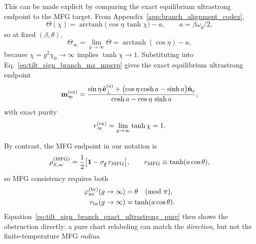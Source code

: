This can be made explicit by comparing the exact equilibrium ultrastrong endpoint to the MFG target.  From
Appendix~\ref{app:branch_alignment_codex},
\begin{equation}
    \Theta(\chi)=\operatorname{arctanh}\!\bigl(\cos\eta\,\tanh\chi\bigr)-a,
    \qquad a=\beta\omega_q/2,
    \label{eq:tilt_sign_branch_Theta_of_chi_eta}
\end{equation}
so at fixed $(\beta,\theta)$,
\begin{equation}
    \Theta_\infty=\lim_{g\to\infty}\Theta=\operatorname{arctanh}(\cos\eta)-a,
    \label{eq:tilt_sign_branch_Theta_infty}
\end{equation}
because $\chi=g^2\chi_0\to\infty$ implies $\tanh\chi\to 1$.  Substituting into
Eq.~\eqref{eq:tilt_sign_branch_mz_mperp} gives the exact equilibrium ultrastrong endpoint
\begin{equation}
    \mathbf m_{\infty}^{\rm(ex)}
    =
    \frac{
        \sin\eta\,\hat{\mathbf e}_{\perp}^{(s)}
        +
        \bigl(\cos\eta\cosh a-\sinh a\bigr)\hat{\mathbf n}_s
    }{
        \cosh a-\cos\eta\,\sinh a
    },
    \label{eq:tilt_sign_branch_exact_ultrastrong_vector}
\end{equation}
with exact purity
\begin{equation}
    r_{\infty}^{\rm(ex)}=\lim_{g\to\infty}\tanh\chi=1.
    \label{eq:tilt_sign_branch_exact_ultrastrong_pure}
\end{equation}

By contrast, the MFG endpoint in our notation is
\begin{equation}
    \rho_{S,\infty}^{\rm(MFG)}
    =
    \frac12\bigl[\mathbf 1-\sigma_{\hat{\mathbf f}}\,r_{\rm MFG}\bigr],
    \qquad
    r_{\rm MFG}\equiv \tanh(a\cos\theta),
    \label{eq:tilt_sign_branch_mfg_reparam}
\end{equation}
so MFG consistency requires both
\begin{align}
    \varphi_{\rm ax}^{\rm(br)}(g\to\infty) &= \theta \quad (\mathrm{mod}\ \pi),
    \label{eq:tilt_sign_branch_mfg_angle_condition}
    \\
    r_{\rm br}(g\to\infty) &= \tanh(a\cos\theta).
    \label{eq:tilt_sign_branch_mfg_radius_condition}
\end{align}
Equation~\eqref{eq:tilt_sign_branch_exact_ultrastrong_pure} then shows the obstruction directly: a pure chart
relabeling can match the \emph{direction}, but not the finite-temperature MFG \emph{radius}.

